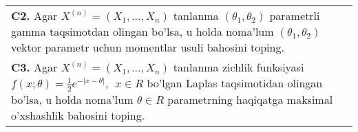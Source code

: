 \documentclass{article}
\begin{document}
\begin{tabular}{m{17cm}}
\\
\textbf{C2.} 
Agar \(X^{(n)} = \left( X_{1},...,X_{n} \right)\) tanlanma \(\left( \theta_{1},\theta_{2} \right)\) parametrli gamma taqsimotdan olingan bo'lsa, u holda noma'lum \(\left( \theta_{1},\theta_{2} \right)\) vektor parametr uchun momentlar usuli bahosini toping.
\\
\textbf{C3.} 
Agar \(X^{(n)} = \left( X_{1},...,X_{n} \right)\) tanlanma zichlik funksiyasi\(f(x;\theta) = \frac{1}{2}e^{- |x - \theta|},\ \ x \in R\) bo'lgan Laplas taqsimotidan olingan bo'lsa, u holda noma'lum \(\theta \in R\) parametrning haqiqatga maksimal o'xshashlik bahosini toping.
\\

\end{tabular}
\vspace{1cm}
\end{document}
